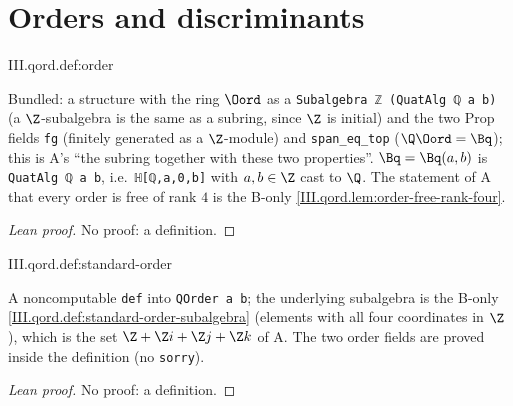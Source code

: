 \section{Orders and discriminants}\label{sec:qord-orders}

\begin{definition}[orders]
\end{definition}
\begin{tfformal}{III.qord.def:order}
\begin{tffidelity}
Bundled: a structure with the ring $\Oord$ as a \texttt{Subalgebra ℤ (QuatAlg ℚ a b)} (a $\Z$-subalgebra is the same as a subring, since $\Z$ is initial) and the two Prop fields \texttt{fg} (finitely generated as a $\Z$-module) and \texttt{span\_eq\_top} ($\Q\Oord=\Bq$); this is A's ``the subring together with these two properties''. $\Bq=\Bq(a,b)$ is \texttt{QuatAlg ℚ a b}, i.e.\ \texttt{ℍ[ℚ,a,0,b]} with $a,b\in\Z$ cast to $\Q$. The statement of A that every order is free of rank $4$ is the B-only \cref{III.qord.lem:order-free-rank-four}.
\end{tffidelity}
\end{tfformal}
\begin{proof}[Lean proof]
No proof: a definition.
\end{proof}

\begin{definition}
\end{definition}
\begin{tfformal}{III.qord.def:standard-order}
\begin{tffidelity}
A noncomputable \texttt{def} into \texttt{QOrder a b}; the underlying subalgebra is the B-only \cref{III.qord.def:standard-order-subalgebra} (elements with all four coordinates in $\Z$), which is the set $\Z+\Z i+\Z j+\Z k$ of A. The two order fields are proved inside the definition (no \texttt{sorry}).
\end{tffidelity}
\end{tfformal}
\begin{proof}[Lean proof]
No proof: a definition.
\end{proof}

